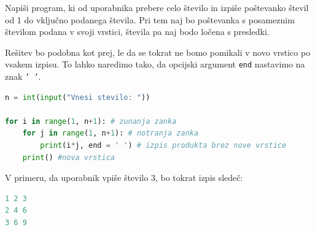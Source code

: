 \begin{zgled}
Napiši program, ki od uporabnika prebere celo število in izpiše poštevanko števil od 1 do vključno podanega števila. Pri tem naj bo poštevanka s posameznim številom podana v svoji vrstici, števila pa naj bodo ločena s presledki.
\end{zgled}
\begin{resitev}
Rešitev bo podobna kot prej, le da se tokrat ne bomo pomikali v novo vrstico po vsakem izpisu. To lahko naredimo tako, da opcijski argument  \texttt{end} nastavimo na znak \texttt{' '}.

\begin{lstlisting}[language=Python]
n = int(input("Vnesi stevilo: "))

for i in range(1, n+1): # zunanja zanka
    for j in range(1, n+1): # notranja zanka
        print(i*j, end = ' ') # izpis produkta brez nove vrstice
    print() #nova vrstica
\end{lstlisting}
V primeru, da uporabnik vpiše število 3, bo tokrat izpis sledeč:
\begin{lstlisting}[language=Python]
1 2 3
2 4 6
3 6 9
\end{lstlisting}
\end{resitev}
